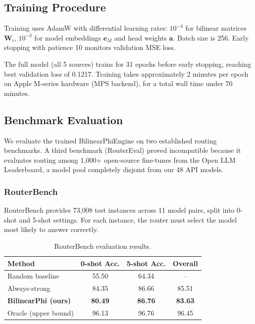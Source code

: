 \subsection{Training Procedure}

Training uses AdamW with differential learning rates: $10^{-4}$ for bilinear matrices $\mathbf{W}_i$, $10^{-3}$ for model embeddings $\mathbf{e}_M$ and head weights $\mathbf{a}$. Batch size is 256. Early stopping with patience 10 monitors validation MSE loss.

The full model (all 5 sources) trains for 31 epochs before early stopping, reaching best validation loss of 0.1217. Training takes approximately 2 minutes per epoch on Apple M-series hardware (MPS backend), for a total wall time under 70 minutes.

\subsection{Benchmark Evaluation}

We evaluate the trained BilinearPhiEngine on two established routing benchmarks. A third benchmark (RouterEval) proved incompatible because it evaluates routing among 1,000+ open-source fine-tunes from the Open LLM Leaderboard, a model pool completely disjoint from our 48 API models.

\subsubsection{RouterBench}

RouterBench \citep{hu2024routerbench} provides 73,008 test instances across 11 model pairs, split into 0-shot and 5-shot settings. For each instance, the router must select the model most likely to answer correctly.

\begin{table}[h]
\centering
\caption{RouterBench evaluation results.}
\label{tab:routerbench_results}
\small
\begin{tabular}{lccc}
\toprule
\textbf{Method} & \textbf{0-shot Acc.} & \textbf{5-shot Acc.} & \textbf{Overall} \\
\midrule
Random baseline & 55.50 & 64.34 & -- \\
Always-strong & 84.35 & 86.66 & 85.51 \\
\textbf{BilinearPhi (ours)} & \textbf{80.49} & \textbf{86.76} & \textbf{83.63} \\
Oracle (upper bound) & 96.13 & 96.76 & 96.45 \\
\bottomrule
\end{tabular}
\end{table}

